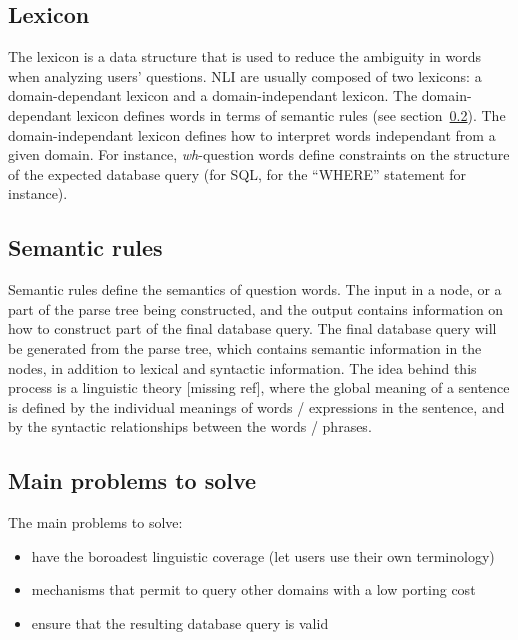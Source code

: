 \documentclass[10pt,journal,letterpaper,compsoc]{IEEEtran}
\begin{document}
\subsection{Lexicon}
The lexicon is a data structure that is used to reduce the ambiguity in words
when analyzing users' questions. 
NLI are usually composed of two lexicons: a domain-dependant lexicon and a
domain-independant lexicon. 
The domain-dependant lexicon defines words in terms of semantic rules (see
section~\ref{sec:anatomy-semantic-rules}).
The domain-independant lexicon defines how to interpret words independant from a
given domain. For instance, {\it wh}-question words define constraints on the
structure of the expected database query (for SQL, for the ``WHERE'' statement
for instance). 


\subsection{Semantic rules}
\label{sec:anatomy-semantic-rules}
Semantic rules define the semantics of question words. The input in a node, or a
part of the parse tree being constructed, and the output contains information on
how to construct part of the final database query. The final database query will
be generated from the parse tree, which contains semantic information in the
nodes, in addition to lexical and syntactic information. 
The idea behind this process is a linguistic theory [missing ref], where the
global meaning of a sentence is defined by the individual meanings of words /
expressions in the sentence, and by the syntactic relationships between the
words / phrases. 




\subsection{Main problems to solve}
The main problems to solve:
\begin{itemize}
  \item have the boroadest linguistic coverage (let users use their own
  terminology)
  \item mechanisms that permit to query other domains with a low porting cost
  \item ensure that the resulting database query is valid
\end{itemize}
\end{document}
